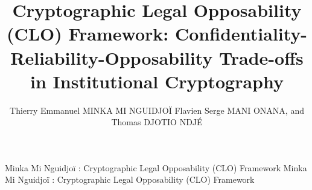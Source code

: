 \documentclass{ieeeaccess}
\begin{document}

\title{Cryptographic Legal Opposability (CLO) Framework: Confidentiality-Reliability-Opposability Trade-offs in Institutional Cryptography}
\author{Thierry Emmanuel \uppercase{Minka Mi Nguidjoï}
Flavien Serge \uppercase{Mani Onana}, and Thomas \uppercase{Djotio Ndjé}}

\address[1]{Laboratory of Mathematical Engineering and Information Systems, National Advanced School of Engineering, University of Yaoundé I, Cameroon (e-mail: minkathierry@gmail.com, serge.mani@digitworldacademy.com, tdjotio@gmail.com)}

\address[2]{Supreme State Audit Office, Po.Box 376 Administrative Center, Yaoundé, Cameroon (e-mail: minkathierry@gmail.com)}


\markboth
{Minka Mi Nguidjoï \headeretal: Cryptographic Legal Opposability (CLO) Framework}
{Minka Mi Nguidjoï \headeretal: Cryptographic Legal Opposability (CLO) Framework}

\end{document}
